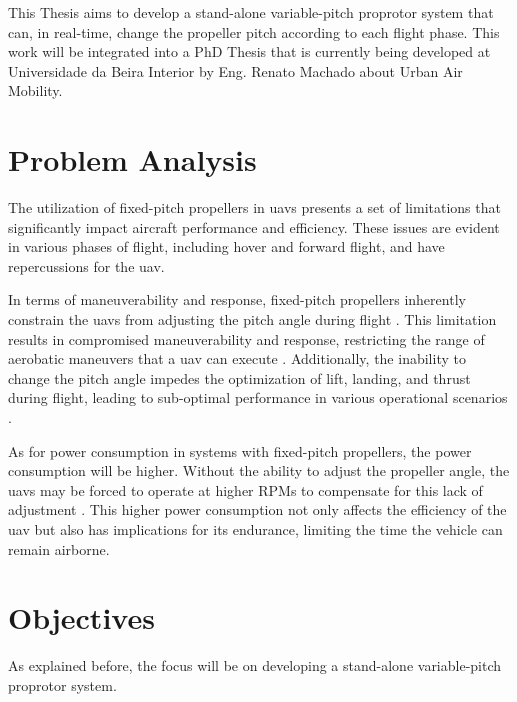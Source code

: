 This Thesis aims to develop a stand-alone variable-pitch proprotor system that can, in real-time, change the propeller pitch according to each flight phase.
This work will be integrated into a PhD Thesis that is currently being developed at Universidade da Beira Interior by Eng. Renato Machado about Urban Air Mobility.


\section{Problem Analysis}
The utilization of fixed-pitch propellers in \glspl{uav} presents a set of limitations that significantly impact aircraft performance and efficiency.
These issues are evident in various phases of flight, including hover and forward flight, and have repercussions for the \gls{uav}.

In terms of maneuverability and response, fixed-pitch propellers inherently constrain the \glspl{uav} from adjusting the pitch angle during flight \cite{FPP1}.
This limitation results in compromised maneuverability and response, restricting the range of aerobatic maneuvers that a \gls{uav} can execute \cite{FPP1}.
Additionally, the inability to change the pitch angle impedes the optimization of lift, landing, and thrust during flight, leading to sub-optimal performance in various operational scenarios \cite{FPP1}.

As for power consumption in systems with fixed-pitch propellers, the power consumption will be higher.
Without the ability to adjust the propeller angle, the \glspl{uav} may be forced to operate at higher \glspl{RPM} to compensate for this lack of adjustment \cite{FPP1}.
This higher power consumption not only affects the efficiency of the \gls{uav} but also has implications for its endurance, limiting the time the vehicle can remain airborne.





\section{Objectives}
As explained before, the focus will be on developing a stand-alone variable-pitch proprotor system.

